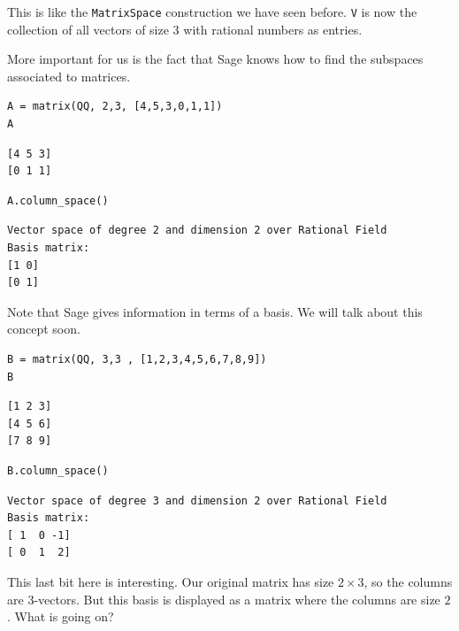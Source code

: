 \documentclass[10pt,]{book}
\theoremstyle{plain}
\numberwithin{equation}{section}
\begin{document}
      This is like the \verb?MatrixSpace? construction we have seen before.
      \verb?V? is now the collection of all vectors of size \(3\) with
      rational numbers as entries.
\par

      More important for us is the fact that Sage knows how to find the subspaces
      associated to matrices.
\begin{lstlisting}[style=sageinput]
A = matrix(QQ, 2,3, [4,5,3,0,1,1])
A
\end{lstlisting}
\begin{lstlisting}[style=sageoutput]
[4 5 3]
[0 1 1]
\end{lstlisting}
\begin{lstlisting}[style=sageinput]
A.column_space()
\end{lstlisting}
\begin{lstlisting}[style=sageoutput]
Vector space of degree 2 and dimension 2 over Rational Field
Basis matrix:
[1 0]
[0 1]
\end{lstlisting}
\par

      Note that Sage gives information in terms of a basis. We will talk about
      this concept soon.
\begin{lstlisting}[style=sageinput]
B = matrix(QQ, 3,3 , [1,2,3,4,5,6,7,8,9])
B
\end{lstlisting}
\begin{lstlisting}[style=sageoutput]
[1 2 3]
[4 5 6]
[7 8 9]
\end{lstlisting}
\begin{lstlisting}[style=sageinput]
B.column_space()
\end{lstlisting}
\begin{lstlisting}[style=sageoutput]
Vector space of degree 3 and dimension 2 over Rational Field
Basis matrix:
[ 1  0 -1]
[ 0  1  2]
\end{lstlisting}
\par

      This last bit here is interesting.
      Our original matrix has size \(2\times 3\), so the columns are \(3\)-vectors.
      But this basis is displayed as a matrix where the columns are size \(2\).
      What is going on?
\par
\end{document}
